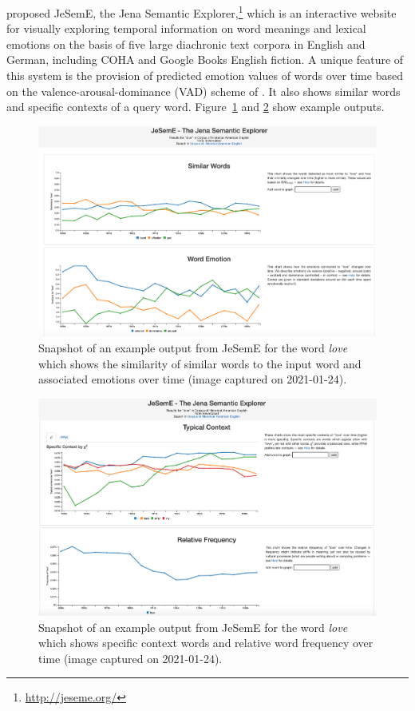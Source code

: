 \documentclass[output=paper]{langsci/langscibook}
\begin{document}
\citet{jeseme} proposed JeSemE, the Jena Semantic Explorer,\footnote{\url{http://jeseme.org/}} which is an interactive website for visually exploring temporal information on word meanings and lexical emotions on the basis of five large diachronic text corpora in English and German, including COHA and Google Books English fiction. A unique feature of this system is the provision of predicted emotion values of words over time based on the valence-arousal-dominance (VAD) scheme of \cite{bradley1994measuring}. It also shows similar words and specific contexts of a query word. Figure~\ref{fig:jeseme1} and \ref{fig:jeseme2} show example outputs.

\begin{figure}
	\includegraphics[width=.9\textwidth]{figures/JATOWT_Jeseme1.png}
        \caption{Snapshot of an example output from JeSemE for the word \textit{love} which shows the similarity of similar words to the input word and associated emotions over time (image captured on 2021-01-24).\label{fig:jeseme1}}
\end{figure}

\begin{figure}
	\includegraphics[width=.9\textwidth]{figures/JATOWT_Jeseme2.png}
        \caption{Snapshot of an example output from JeSemE for the word \textit{love}  which shows specific context words and relative word frequency over time (image captured on 2021-01-24).\label{fig:jeseme2}}
\end{figure}
\end{document}
